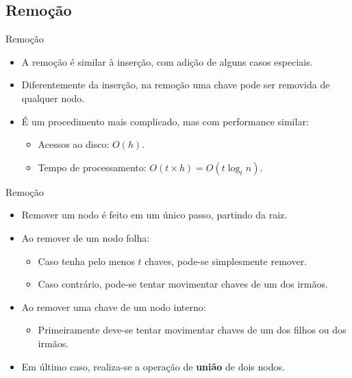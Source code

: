 \documentclass[aspectratio=169]{beamer}
\begin{document}
{%
\subsection{Remoção}

\begin{frame}{Remoção}
\begin{itemize}
 \item A remoção é similar à inserção, com adição de alguns casos especiais.
 \item Diferentemente da inserção, na remoção uma chave pode ser removida de qualquer nodo.
 \item É um procedimento mais complicado, mas com performance similar: 
 \begin{itemize}
 \item Acessos ao disco: $O(h)$.
 \item Tempo de processamento: $O(t \times h) = O(t \log_t n)$.
 \end{itemize} 
\end{itemize}
\end{frame}


\begin{frame}{Remoção}
\begin{itemize}
 \item Remover um nodo é feito em um único passo, partindo da raiz.
 \item Ao remover de um nodo folha:
 \begin{itemize}
 \item Caso tenha pelo menos $t$ chaves, pode-se simplesmente remover.
 \item Caso contrário, pode-se tentar movimentar chaves de um dos irmãos. 
\end{itemize}
 \item Ao remover uma chave de um nodo interno:
 \begin{itemize}
 \item Primeiramente deve-se tentar movimentar chaves de um dos filhos ou dos irmãos.
\end{itemize}
 \item Em último caso, realiza-se a operação de {\bf união} de dois nodos.
\end{itemize}
\end{frame}

}
\end{document}
